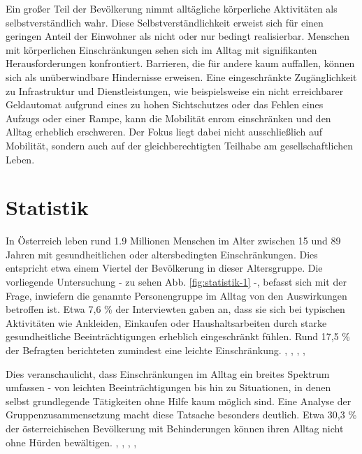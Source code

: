 
Ein großer Teil der Bevölkerung nimmt alltägliche körperliche Aktivitäten als selbstverständlich wahr. Diese Selbstverständlichkeit erweist sich für einen geringen Anteil der Einwohner als nicht oder nur bedingt realisierbar. Menschen mit körperlichen Einschränkungen sehen sich im Alltag mit signifikanten Herausforderungen konfrontiert. Barrieren, die für andere kaum auffallen, können sich als unüberwindbare Hindernisse erweisen. Eine eingeschränkte Zugänglichkeit zu Infrastruktur und Dienstleistungen, wie beispielsweise ein nicht erreichbarer Geldautomat aufgrund eines zu hohen Sichtschutzes oder das Fehlen eines Aufzugs oder einer Rampe, kann die Mobilität enrom einschränken und den Alltag erheblich erschweren. Der Fokus liegt dabei nicht ausschließlich auf Mobilität, sondern auch auf der gleichberechtigten Teilhabe am gesellschaftlichen Leben.

\section{Statistik}
In Österreich leben rund 1.9 Millionen Menschen im Alter zwischen 15 und 89 Jahren mit gesundheitlichen oder altersbedingten Einschränkungen. Dies entspricht etwa einem Viertel der Bevölkerung in dieser Altersgruppe. Die vorliegende Untersuchung - zu sehen Abb. \ref{fig:statistik-1} -, befasst sich mit der Frage, inwiefern die genannte Personengruppe im Alltag von den Auswirkungen betroffen ist. Etwa 7,6 \% der Interviewten gaben an, dass sie sich bei typischen Aktivitäten wie Ankleiden, Einkaufen oder Haushaltsarbeiten durch starke gesundheitliche Beeinträchtigungen erheblich eingeschränkt fühlen. Rund 17,5 \% der Befragten berichteten zumindest eine leichte Einschränkung.
\cite{SchullerVictoriaMlinareviNikolinaKlimont2024}, \cite{IUFEAT-Wien2023}, \cite{KletzmayrKerstin2022}, \cite{IsabellaSkiba2020}, \cite{JuliaSofieWieder2025}

Dies veranschaulicht, dass Einschränkungen im Alltag ein breites Spektrum umfassen - von leichten Beeinträchtigungen bis hin zu Situationen, in denen selbst grundlegende Tätigkeiten ohne Hilfe kaum möglich sind. Eine Analyse der Gruppenzusammensetzung macht diese Tatsache besonders deutlich. Etwa 30,3 \% der österreichischen Bevölkerung mit Behinderungen können ihren Alltag nicht ohne Hürden bewältigen.
\cite{SchullerVictoriaMlinareviNikolinaKlimont2024}, \cite{IUFEAT-Wien2023}, \cite{KletzmayrKerstin2022}, \cite{IsabellaSkiba2020}, \cite{JuliaSofieWieder2025}

